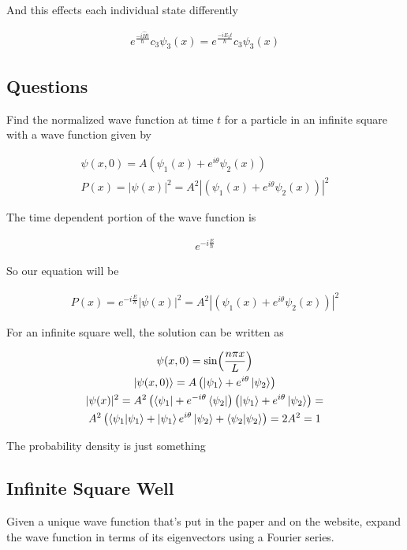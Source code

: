 \documentclass[fleqn]{report}
\newcommand{\equations} [1] {
\begin{gather*}
#1
\end{gather*}
}
\begin{document}
And this effects each individual state differently 
\equations{
    e^{\frac{-i \hat H t}{\hbar}}
    c_3 \psi_3(x)
    =
    e^{\frac{-i E_3 t}{\hbar}}
    c_3 \psi_3(x)
}

\subsection{Questions}
Find the normalized wave function at time $t$ for a particle in an 
infinite square with a wave function given by 
\equations{
    \psi(x, 0)
    =
    A 
    \left(
        \psi_1(x)
        +
        e^{i \theta}
        \psi_2(x)
    \right)
    \\
    P(x)
    =
    |\psi(x)|^2 
    =
    A^2 
    |\left(
        \psi_1(x)
        +
        e^{i \theta}
        \psi_2(x)
    \right)|^2
}

The time dependent portion of the wave function is 
\equations{
    e^{-i \frac{E}{\hbar}}
}

So our equation will be 

\equations{
    P(x)
    =
    e^{-i \frac{E}{\hbar}}
    |\psi(x)|^2 
    =
    A^2 
    |\left(
        \psi_1(x)
        +
        e^{i \theta}
        \psi_2(x)
    \right)|^2
}

For an infinite square well, the solution can be written as 
\equations{
    \psi(x, 0)
    =
    \sin(\frac{n \pi x}{L})
    \\
    \ket{\psi(x, 0)}
    =
    A 
    \left(
        \ket{\psi_1}
        +
        e^{i \theta}
        \ket{\psi_2}
    \right)
    \\
    |\psi(x)|^2
    =
    A^2 
    \left(
        \bra{\psi_1}
        +
        e^{-i \theta}
        \bra{\psi_2}
    \right)
    \left(
        \ket{\psi_1}
        +
        e^{i \theta}
        \ket{\psi_2}
    \right)
    =
    \\
    A^2 
    \left(
        \bra{\psi_1}\ket{\psi_1}
        +
        \ket{\psi_1}
        e^{i \theta}
        \ket{\psi_2}
        +
        \bra{\psi_2}\ket{\psi_2}
    \right)
    =
    2A^2
    =1
}

The probability density is just something 

\subsection{Infinite Square Well}
Given a unique wave function that's put in the paper and on the website, 
expand the wave function in terms of its eigenvectors using 
a Fourier series.
\end{document}
